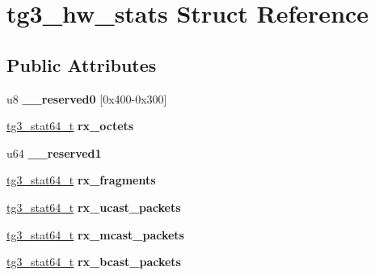 \hypertarget{structtg3__hw__stats}{
\section{tg3\_\-hw\_\-stats Struct Reference}
\label{structtg3__hw__stats}
}
\subsection*{Public Attributes}
\begin{DoxyCompactItemize}
\item 
\hypertarget{structtg3__hw__stats_a8db9a23432c399f8ed7e0f12ff19cff9}{
u8 {\bfseries \_\-\_\-reserved0} \mbox{[}0x400-\/0x300\mbox{]}}
\label{structtg3__hw__stats_a8db9a23432c399f8ed7e0f12ff19cff9}

\item 
\hypertarget{structtg3__hw__stats_a371ba1244e089c1b33ab9b188d93b25b}{
\hyperlink{structtg3__stat64__t}{tg3\_\-stat64\_\-t} {\bfseries rx\_\-octets}}
\label{structtg3__hw__stats_a371ba1244e089c1b33ab9b188d93b25b}

\item 
\hypertarget{structtg3__hw__stats_aaa77d667dfa97ad0d7758c053ecc7baa}{
u64 {\bfseries \_\-\_\-reserved1}}
\label{structtg3__hw__stats_aaa77d667dfa97ad0d7758c053ecc7baa}

\item 
\hypertarget{structtg3__hw__stats_ad62c3997426207bebe14c9fb8e868af7}{
\hyperlink{structtg3__stat64__t}{tg3\_\-stat64\_\-t} {\bfseries rx\_\-fragments}}
\label{structtg3__hw__stats_ad62c3997426207bebe14c9fb8e868af7}

\item 
\hypertarget{structtg3__hw__stats_ad2f2920b13fbda15537e326d92b652a4}{
\hyperlink{structtg3__stat64__t}{tg3\_\-stat64\_\-t} {\bfseries rx\_\-ucast\_\-packets}}
\label{structtg3__hw__stats_ad2f2920b13fbda15537e326d92b652a4}

\item 
\hypertarget{structtg3__hw__stats_acf1b77d87a77e613ad42c167368a7f90}{
\hyperlink{structtg3__stat64__t}{tg3\_\-stat64\_\-t} {\bfseries rx\_\-mcast\_\-packets}}
\label{structtg3__hw__stats_acf1b77d87a77e613ad42c167368a7f90}

\item 
\hypertarget{structtg3__hw__stats_a03cf50aa5558208f8c83c7dd5205bf5e}{
\hyperlink{structtg3__stat64__t}{tg3\_\-stat64\_\-t} {\bfseries rx\_\-bcast\_\-packets}}
\label{structtg3__hw__stats_a03cf50aa5558208f8c83c7dd5205bf5e}


\end{DoxyCompactItemize}

